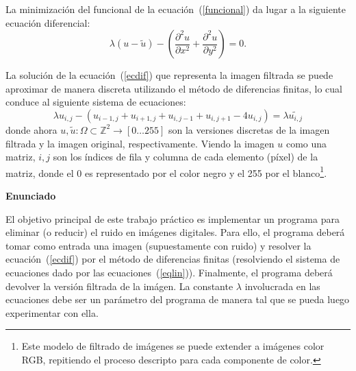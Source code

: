 \documentclass[a4paper]{article}
\begin{document}
La minimizaci\'on del funcional de la ecuaci\'on~(\ref{funcional}) da lugar a la siguiente ecuaci\'on diferencial:
\begin{equation}
 \lambda \left( u - \tilde{u} \right) - \left( \frac{\partial^2 u}{\partial x^2} + \frac{\partial^2 u}{\partial y^2} \right) = 0.
\label{ecdif}
\end{equation}

La soluci\'on de la ecuaci\'on~(\ref{ecdif}) que representa la imagen filtrada se puede aproximar de manera discreta utilizando el m\'etodo de diferencias finitas, lo cual conduce al siguiente sistema de ecuaciones:
\begin{equation}
 \lambda u_{i,j} - \left( u_{i-1,j} + u_{i+1,j} + u_{i,j-1} + u_{i,j+1} - 4 u_{i,j} \right) = \lambda \tilde{u_{i,j}}
 \label{eqlin}
\end{equation}
donde ahora $u,\tilde{u} : \Omega \subset \mathbb{Z}^2 \to [0 \dots 255]$ son la versiones discretas de la imagen filtrada y la imagen original, respectivamente. Viendo la imagen $u$ como una matriz, $i,j$ son los \'indices de fila y columna de cada elemento (p\'ixel)  de la matriz, donde el 0 es representado por el color negro y el 255 por el blanco\footnote{Este modelo de filtrado de im\'agenes se puede extender a im\'agenes color RGB, repitiendo el proceso descripto para cada componente de color.}.

{\bf Enunciado}

El objetivo principal de este trabajo pr\'actico es implementar un programa para eliminar (o reducir) el ruido en im\'agenes digitales. Para ello, el programa deber\'a tomar como entrada una imagen (supuestamente con ruido) y resolver la ecuaci\'on~(\ref{ecdif}) por el m\'etodo de diferencias finitas (resolviendo el sistema de ecuaciones dado por las ecuaciones~(\ref{eqlin})). Finalmente, el programa deber\'a devolver la versi\'on filtrada de la im\'agen. La constante $\lambda$ involucrada en las ecuaciones debe ser un par\'ametro del programa de manera tal que se pueda luego experimentar con ella.
\end{document}
